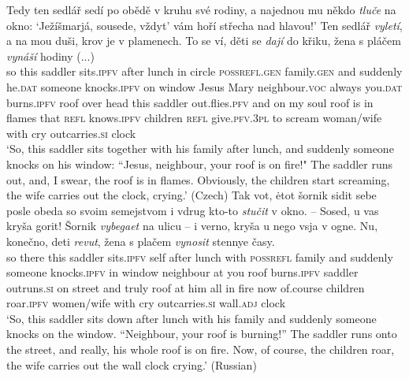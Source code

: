 \documentclass[output=paper,colorlinks,citecolor=brown]{langscibook}
\begin{document}
\ea\label{ex:histpres}
\ea 
\gll Tedy ten sedlář sedí po obědě v kruhu své rodiny, a najednou mu někdo \textit{tluče} na okno: `Ježíšmarjá, sousede, vždyt' vám hoří střecha nad hlavou!' Ten sedlář \textit{vyletí}, a na mou duši, krov je v plamenech. To se ví, děti se \textit{dají} do křiku, žena s pláčem \textit{vynáší} hodiny (...)\\
so this saddler sits.\textsc{ipfv} after lunch in circle \textsc{possrefl.gen} family.\textsc{gen} and suddenly he.\textsc{dat} someone knocks.\textsc{ipfv} on window {Jesus Mary} neighbour.\textsc{voc} always you.\textsc{dat} burns.\textsc{ipfv} roof over head this saddler out.flies.\textsc{pfv} and on my soul roof is in flames that \textsc{refl} knows.\textsc{ipfv} children \textsc{refl} give.\textsc{pfv.3pl} to scream woman/wife with cry outcarries.\textsc{si} clock {} \\
\glt `So, this saddler sits together with his family after lunch, and suddenly someone knocks on his window: ``Jesus, neighbour, your roof is on fire!" The saddler runs out, and, I swear, the roof is in flames. Obviously, the children start screaming, the wife carries out the clock, crying.' \hfill (Czech)
\ex
\gll Tak vot, ėtot šornik sidit sebe posle obeda so svoim semejstvom i vdrug kto-to \textit{stučit} v okno. -- Sosed, u vas kryša gorit! Šornik \textit{vybegaet} na ulicu -- i verno, kryša u nego vsja v ogne. Nu, konečno, deti \textit{revut}, žena s plačem \textit{vynosit} stennye časy.\\
so there this saddler sits.\textsc{ipfv} self after lunch with \textsc{possrefl} family and suddenly someone knocks.\textsc{ipfv} in window {} neighbour at you roof burns.\textsc{ipfv} saddler outruns.\textsc{si} on street {} and truly roof at him all in fire now of.course children roar.\textsc{ipfv} women/wife with cry outcarries.\textsc{si} wall.\textsc{adj} clock \\
\glt `So, this saddler sits down after lunch with his family and suddenly someone knocks on the window. ``Neighbour, your roof is burning!'' The saddler runs onto the street, and really, his whole roof is on fire. Now, of course, the children roar, the wife carries out the wall clock crying.' \hfill (Russian)
\z
\z
\end{document}
